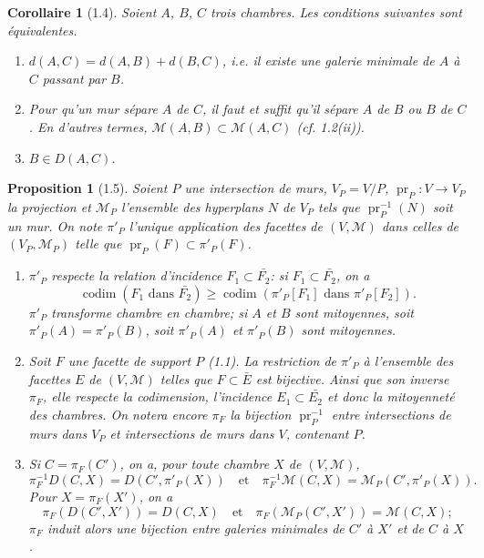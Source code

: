 \documentclass[12pt]{article}
\newtheorem{proposition}[theoreme]{Proposition}
\newtheorem{corollaire}[theoreme]{Corollaire}
\theoremstyle{remark}
\begin{document}
\begin{corollaire}[1.4]
Soient $A$, $B$, $C$ trois chambres. Les conditions suivantes sont équivalentes.
\begin{enumerate}
\item[(i)] $d(A, C) = d(A, B) + d(B, C)$, i.e. il existe une galerie minimale de $A$ à $C$ passant par $B$.
\item[(ii)] Pour qu'un mur sépare $A$ de $C$, il faut et suffit qu'il sépare $A$ de $B$ ou $B$ de $C$. En d'autres termes, $\mathcal{M}(A, B) \subset \mathcal{M}(A, C)$ (cf. 1.2(ii)).
\item[(iii)] $B \in D(A, C)$.
\end{enumerate}
\end{corollaire}

\begin{proposition}[1.5]
Soient $P$ une intersection de murs, $V_P = V/P$, $\operatorname{pr}_P \colon V \to V_P$ la projection et $\mathcal{M}_P$ l'ensemble des hyperplans $N$ de $V_P$ tels que $\operatorname{pr}_P^{-1}(N)$ soit un mur. On note $\pi'_P$ l'unique application des facettes de $(V, \mathcal{M})$ dans celles de $(V_P, \mathcal{M}_P)$ telle que $\operatorname{pr}_P(F) \subset \pi'_P(F)$.
\begin{enumerate}
\item[(i)] $\pi'_P$ respecte la relation d'incidence $F_1 \subset \bar{F_2}$: si $F_1 \subset \bar{F_2}$, on a
\[\operatorname{codim}(F_1 \text{ dans } \bar{F_2}) \geq \operatorname{codim}(\pi'_P[F_1] \text{ dans } \pi'_P[F_2]).\]
$\pi'_P$ transforme chambre en chambre; si $A$ et $B$ sont mitoyennes, soit $\pi'_P(A) = \pi'_P(B)$, soit $\pi'_P(A)$ et $\pi'_P(B)$ sont mitoyennes.
\item[(ii)] Soit $F$ une facette de support $P$ (1.1). La restriction de $\pi'_P$ à l'ensemble des facettes $E$ de $(V, \mathcal{M})$ telles que $F \subset \bar{E}$ est bijective. Ainsi que son inverse $\pi_F$, elle respecte la codimension, l'incidence $E_1 \subset \bar{E_2}$ et donc la mitoyenneté des chambres. On notera encore $\pi_F$ la bijection $\operatorname{pr}_P^{-1}$ entre intersections de murs dans $V_P$ et intersections de murs dans $V$, contenant $P$.
\item[(iii)] Si $C = \pi_F(C')$, on a, pour toute chambre $X$ de $(V, \mathcal{M})$,
\[\pi_F^{-1} D(C, X) = D(C', \pi'_P(X)) \quad \text{et} \quad \pi_F^{-1} \mathcal{M}(C, X) = \mathcal{M}_P(C', \pi'_P(X)).\]
Pour $X = \pi_F(X')$, on a
\[\pi_F(D(C', X')) = D(C, X) \quad \text{et} \quad \pi_F(\mathcal{M}_P(C', X')) = \mathcal{M}(C, X);\]
$\pi_F$ induit alors une bijection entre galeries minimales de $C'$ à $X'$ et de $C$ à $X$.
\end{enumerate}
\end{proposition}
\end{document}

